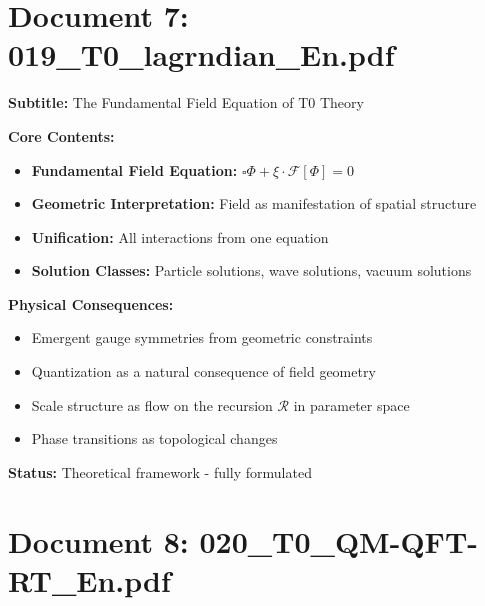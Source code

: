 	\section{Document 7: 019\_T0\_lagrndian\_En.pdf}
	
	\begin{documentbox}
		\textbf{Subtitle:} The Fundamental Field Equation of T0 Theory
		
		\textbf{Core Contents:}
		\begin{itemize}
			\item \textbf{Fundamental Field Equation:} $\square \Phi + \xi \cdot \mathcal{F}[\Phi] = 0$
			\item \textbf{Geometric Interpretation:} Field as manifestation of spatial structure
			\item \textbf{Unification:} All interactions from one equation
			\item \textbf{Solution Classes:} Particle solutions, wave solutions, vacuum solutions
		\end{itemize}
		
		\textbf{Physical Consequences:}
		\begin{itemize}
			\item Emergent gauge symmetries from geometric constraints
			\item Quantization as a natural consequence of field geometry
			\item Scale structure as flow on the recursion $\mathcal{R}$ in parameter space
			\item Phase transitions as topological changes
		\end{itemize}
		
		\textbf{Status:} Theoretical framework - fully formulated
	\end{documentbox}
	
	\section{Document 8: 020\_T0\_QM-QFT-RT\_En.pdf}
	

